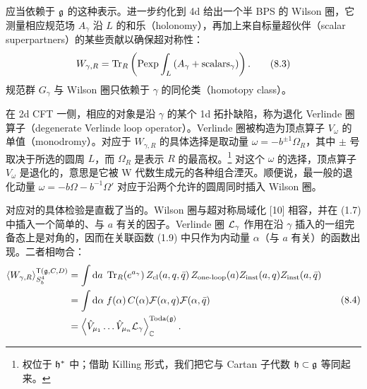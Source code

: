 应当依赖于 $\mathfrak{g}$ 的这种表示。进一步约化到 4d 给出一个半 BPS 的 Wilson 圈，它测量相应规范场 $A_\gamma$ 沿 $L$ 的和乐（holonomy），再加上来自标量超伙伴（scalar superpartners）的某些贡献以确保超对称性：
\begin{equation}
    W_{\gamma,R}=\operatorname{Tr}_R\left(\mathrm{Pexp}\int_L\left(A_\gamma+\mathrm{scalars}_\gamma\right)\right).
    \tag{8.3}
\end{equation}
规范群 $G_\gamma$ 与 Wilson 圈只依赖于 $\gamma$ 的同伦类（homotopy class）。

在 2d CFT 一侧，相应的对象是沿 $\gamma$ 的某个 1d 拓扑缺陷，称为退化 Verlinde 圈算子（degenerate Verlinde loop operator）。Verlinde 圈被构造为顶点算子 $V_\omega$ 的单值（monodromy）。对应于 $W_{\gamma,R}$ 的具体选择是取动量 $\omega=-b^{\pm1}\Omega_R$，其中 $\pm$ 号取决于所选的圆周 $L$，而 $\Omega_R$ 是表示 $R$ 的最高权。\footnote{权位于 $\mathfrak{h}^*$ 中；借助 Killing 形式，我们把它与 Cartan 子代数 $\mathfrak{h}\subset\mathfrak{g}$ 等同起来。} 对这个 $\omega$ 的选择，顶点算子 $V_\omega$ 是退化的，意思是它被 W 代数生成元的各种组合湮灭。顺便说，最一般的退化动量 $\omega=-b\Omega-b^{-1}\Omega'$ 对应于沿两个允许的圆周同时插入 Wilson 圈。

对应对的具体检验是直截了当的。Wilson 圈与超对称局域化 [10] 相容，并在 (1.7) 中插入一个简单的、与 $a$ 有关的因子。Verlinde 圈 $\mathcal{L}_\gamma$ 作用在沿 $\gamma$ 插入的一组完备态上是对角的，因而在关联函数 (1.9) 中只作为内动量 $\alpha$（与 $a$ 有关）的函数出现。二者相吻合：
\begin{equation}
\begin{aligned}
    \langle W_{\gamma,R}\rangle^{\mathsf{T}(\mathfrak{g},C,D)}_{S^4_b}
    &=\int\mathrm{d} a\;\operatorname{Tr}_R(e^{a_\gamma})\,Z_{\mathrm{cl}}(a,q,\bar q)\,Z_{\text{one-loop}}(a)Z_{\mathrm{inst}}(a,q)Z_{\mathrm{inst}}(a,\bar q)\\
    &=\int\mathrm{d}\alpha\;f(\alpha)\,C(\alpha)\mathcal{F}(\alpha,q)\mathcal{F}(\alpha,\bar q)\\
    &=\left\langle\hat V_{\mu_1}\ldots\hat V_{\mu_n}\mathcal{L}_\gamma\right\rangle^{\mathrm{Toda}(\mathfrak{g})}_{\mathbb{C}}.
\end{aligned}
    \tag{8.4}
\end{equation}


